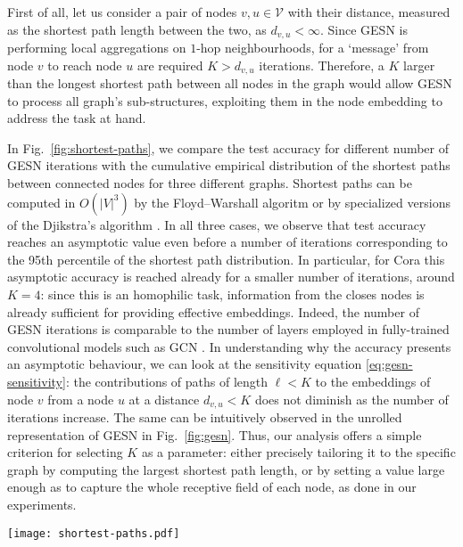 \documentclass[final,5p,times,twocolumn]{elsarticle}
\begin{document}
First of all, let us consider a pair of nodes $v, u \in \mathcal{V}$ with their distance, measured as the shortest path length between the two, as $d_{v,u} < \infty$.
Since GESN is performing local aggregations on $1$-hop neighbourhoods, for a `message' from node $v$ to reach node $u$ are required $K > d_{v,u}$ iterations.
Therefore, a $K$ larger than the longest shortest path between all nodes in the graph would allow GESN to process all graph's sub-structures, exploiting them in the node embedding to address the task at hand.

In Fig.~\ref{fig:shortest-paths}, we compare the test accuracy for different number of GESN iterations with the cumulative empirical distribution of the shortest paths between connected nodes for three different graphs.
Shortest paths can be computed in $O(|V|^3)$ by the Floyd--Warshall algoritm \cite{Floyd1962} or by specialized versions of the Djikstra's algorithm \cite{Ahuja1990}.
In all three cases, we observe that test accuracy reaches an asymptotic value even before a number of iterations corresponding to the 95th percentile of the shortest path distribution.
In particular, for Cora this asymptotic accuracy is reached already for a smaller number of iterations, around $K = 4$: since this is an homophilic task, information from the closes nodes is already sufficient for providing effective embeddings.
Indeed, the number of GESN iterations is comparable to the number of layers employed in fully-trained convolutional models such as GCN \cite{Li2018}.
In understanding why the accuracy presents an asymptotic behaviour, we can look at the sensitivity equation \eqref{eq:gesn-sensitivity}: the contributions of paths of length $\ell < K$ to the embeddings of node $v$ from a node $u$ at a distance $d_{v,u} < K$ does not diminish as the number of iterations increase.
The same can be intuitively observed in the unrolled representation of GESN in Fig.~\ref{fig:gesn}.
Thus, our analysis offers a simple criterion for selecting $K$ as a parameter: either precisely tailoring it to the specific graph by computing the largest shortest path length, or by setting a value large enough as to capture the whole receptive field of each node, as done in our experiments.

\begin{figure*}
	\centering
	\texttt{[image: shortest-paths.pdf]}
	\caption{The curve of test accuracy in function of GESN iterations $K-1$ compared against the empirical cumulative distribution (ECD) of shortest paths between reachable nodes in the task graph ($4096$ reservoir units, other parameters chosen by model selection).}
	\label{fig:shortest-paths}
\end{figure*}
\end{document}
